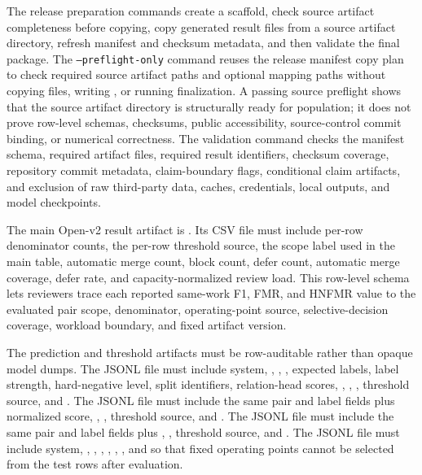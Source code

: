 \documentclass[11pt]{article}
\begin{document}
The release preparation commands create a scaffold, check source artifact completeness before copying, copy generated result files from a source artifact directory, refresh manifest and checksum metadata, and then validate the final package. The \texttt{--preflight-only} command reuses the release manifest copy plan to check required source artifact paths and optional mapping paths without copying files, writing , or running finalization. A passing source preflight shows that the source artifact directory is structurally ready for population; it does not prove row-level schemas, checksums, public accessibility, source-control commit binding, or numerical correctness. The validation command checks the manifest schema, required artifact files, required result identifiers, checksum coverage, repository commit metadata, claim-boundary flags, conditional claim artifacts, and exclusion of raw third-party data, caches, credentials, local outputs, and model checkpoints.

The main Open-v2 result artifact is . Its CSV file must include per-row denominator counts, the per-row threshold source, the scope label used in the main table, automatic merge count, block count, defer count, automatic merge coverage, defer rate, and capacity-normalized review load. This row-level schema lets reviewers trace each reported same-work F1, FMR, and HNFMR value to the evaluated pair scope, denominator, operating-point source, selective-decision coverage, workload boundary, and fixed artifact version.

The prediction and threshold artifacts must be row-auditable rather than opaque model dumps. The  JSONL file must include system, , , , expected labels, label strength, hard-negative level, split identifiers, relation-head scores, , , , threshold source, and . The  JSONL file must include the same pair and label fields plus normalized score, , , threshold source, and . The  JSONL file must include the same pair and label fields plus , , threshold source, and . The  JSONL file must include system, , , , , , , and  so that fixed operating points cannot be selected from the test rows after evaluation.
\end{document}
